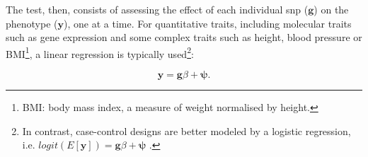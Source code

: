 The test, then, consists of assessing the effect of each individual \gls{snp} ($\mathbf{g}$) on the phenotype ($\mathbf{y}$), one at a time.
For quantitative traits, including molecular traits such as gene expression and some complex traits such as height, blood pressure or BMI\footnote{BMI: body mass index, a measure of weight normalised by height.}, a linear regression is typically used\footnote{In contrast, case-control designs are better modeled by a logistic regression, i.e. $logit(E[\mathbf{y}]) = \mathbf{g}\beta + \boldsymbol{\psi}$ \cite{chen2001general,clayton2013statistical}.}:

\begin{equation}\label{eq:Linear_regression_genetics}
 \mathbf{y} = \mathbf{g}\beta + \boldsymbol{\psi}. 
\end{equation}

\newpage








